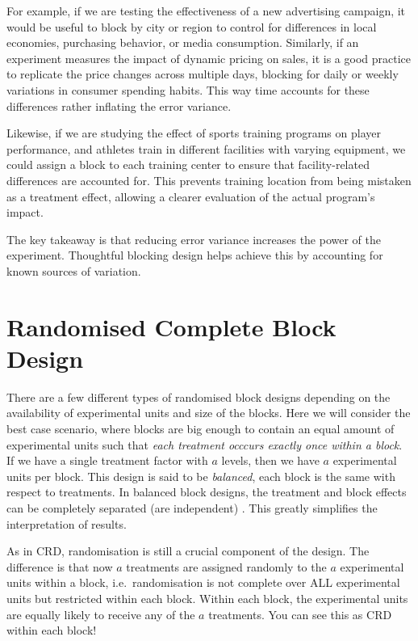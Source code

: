 \documentclass[
  letterpaper,
]{book}
\begin{document}
For example, if we are testing the effectiveness of a new advertising
campaign, it would be useful to block by city or region to control for
differences in local economies, purchasing behavior, or media
consumption. Similarly, if an experiment measures the impact of dynamic
pricing on sales, it is a good practice to replicate the price changes
across multiple days, blocking for daily or weekly variations in
consumer spending habits. This way time accounts for these differences
rather inflating the error variance.

Likewise, if we are studying the effect of sports training programs on
player performance, and athletes train in different facilities with
varying equipment, we could assign a block to each training center to
ensure that facility-related differences are accounted for. This
prevents training location from being mistaken as a treatment effect,
allowing a clearer evaluation of the actual program's impact.

The key takeaway is that reducing error variance increases the power of
the experiment. Thoughtful blocking design helps achieve this by
accounting for known sources of variation.

\section{Randomised Complete Block
Design}\label{randomised-complete-block-design}

There are a few different types of randomised block designs depending on
the availability of experimental units and size of the blocks. Here we
will consider the best case scenario, where blocks are big enough to
contain an equal amount of experimental units such that \emph{each
treatment occcurs exactly once within a block}. If we have a single
treatment factor with \(a\) levels, then we have \(a\) experimental
units per block. This design is said to be \emph{balanced}, each block
is the same with respect to treatments. In balanced block designs, the
treatment and block effects can be completely separated (are
independent) . This greatly simplifies the interpretation of results.

As in CRD, randomisation is still a crucial component of the design. The
difference is that now \(a\) treatments are assigned randomly to the
\(a\) experimental units within a block, i.e.~randomisation is not
complete over ALL experimental units but restricted within each block.
Within each block, the experimental units are equally likely to receive
any of the \(a\) treatments. You can see this as CRD within each block!
\end{document}
